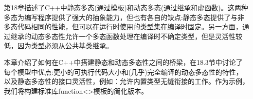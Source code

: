 第18章描述了C++中静态多态(通过模板)和动态多态(通过继承和虚函数)。这两种多态为编写程序提供了强大的抽象能力，但也有各自的缺点:静态多态提供了与非多态代码相同的性能，但可以在运行时使用的类型集在编译时固定。另一方面，通过继承的动态多态性允许一个多态函数处理在编译时不确定类型，但是灵活性较低，因为类型必须从公共基类继承。

本章介绍了如何在C++中搭建静态和动态多态性之间的桥梁，在18.3节中讨论了每个模型中优点:更小的可执行代码大小和(几乎)完全编译的动态多态性的特性，以及静态多态性的接口灵活性，例如：允许内置类型无缝衔接的工作。作为示例，我们将构建标准库function<>模板的简化版本。